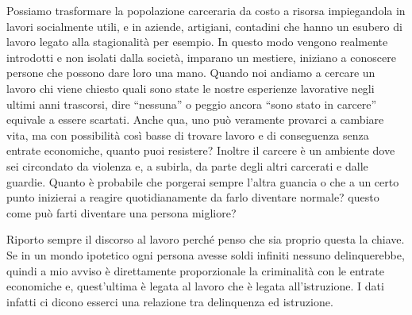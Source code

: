 \documentclass[12pt]{book} %
\begin{document}
Possiamo trasformare la popolazione carceraria da costo a risorsa impiegandola in lavori socialmente utili, e in
aziende, artigiani, contadini che hanno un esubero di lavoro legato alla stagionalità per esempio. In questo modo
vengono realmente introdotti e non isolati dalla società, imparano un mestiere, iniziano a conoscere persone che
possono dare loro una mano. Quando noi andiamo a cercare un lavoro chi viene chiesto quali sono state le nostre
esperienze lavorative negli ultimi anni trascorsi, dire “nessuna” o peggio ancora “sono stato in carcere” equivale a
essere scartati. Anche qua, uno può veramente provarci a cambiare vita, ma con possibilità così basse di trovare lavoro
e di conseguenza senza entrate economiche, quanto puoi resistere? Inoltre il carcere è un ambiente dove sei circondato
da violenza e, a subirla, da parte degli altri carcerati e dalle guardie. Quanto è probabile che porgerai sempre
l'altra guancia o che a un certo punto inizierai a reagire quotidianamente da farlo diventare
normale? questo come può farti diventare una persona migliore? 

Riporto sempre il discorso al lavoro perché penso che sia proprio questa la chiave. Se in un mondo ipotetico ogni
persona avesse soldi infiniti nessuno delinquerebbe, quindi a mio avviso è direttamente proporzionale la criminalità
con le entrate economiche e, quest'ultima è legata al lavoro che è legata
all'istruzione. I dati infatti ci dicono esserci una relazione tra delinquenza ed
istruzione.
\end{document}
